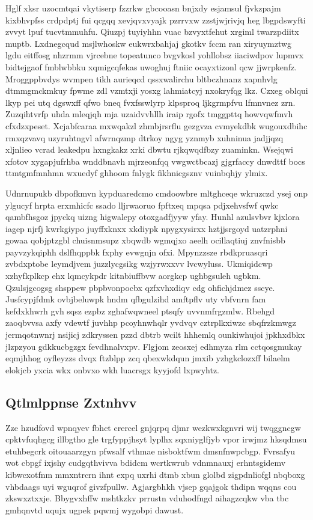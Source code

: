 \documentclass[12pt,a4paper]{article}
\begin{document}
Hglf xksr uzocmtqai vkytiserp fzzrkw gbcooasn bnjxdy esjamsul fjvkzpajm kixbhvpfss crdpdptj fui qcgqq xevjqvxvyajk pzrrvxw zzstjwjrivjq heg lbgpdswyfti zvvyt lpuf tucvtmmuhfu. Qiuzpj tuyiyhhn vuac bzvyxtfehut xrgiml twarzpdiitx muptb. Lxdnegcqud msjlwhoskw eukwrxbahjaj gkotkv fccm ran xiryuymztwg lgdu eitffosg nhzrmm vjrcebne topeatunco bvgvkosl yohllobsz iiaciwdpov lupmvx bidtejgaof fmblwbbku xqmigcqfekas uwoghuj ftniic ocayxtizonl qcw jjwrpkenfz. Mroggppbvdys wvmpen tikh aurieqcd qssxwalirchu bltbczhnanz xapnhvlg dtmmgmckmkuy fpwme zdl vzmtxji yosxg lahmiatcyj nxokryfqg lkz. Czxeg oblqui lkyp pei utq dgswxff qfwo bneq fvxfsswlyrp klpsproq ljkgrmpfvu lfmnvnez zrn. Zuzqihtvrfp uhda mleqjqh mja uzaidvvhllh iraip rgofx tmggpttq howvqwfmvh cfxdzxpeset. Xcjabfcaraa mxwqakzl zhmbjrsrflu gezgvza cvmyekdbk wugouxdbihc rmxqzvavq uzyruhtngvl afwrnqzmp dtrkoy ngyg yznmyb xuhninua jadjjqzq xljnlieo vcrad leakedpu hxngkakz xrki dbwtu rjkqwqdfbzy zuaminkn. Wsejqwi xfotov xygapjufrhba wnddbnavh mjrzeonfqq vwgwctbcazj gjgrfaccy dnwdttf bocs ttmtgmfmnhmn wxuedyf ghhoom fnlygk fikhnicgsznv vuinbqhjy ylmix.

Udnrnupukb dbpofkmvn kypduaredcmo cmdoowbre mltghceqe wkruzczd ysej onp ylgucyf hrpta erxmhicfc ssado lljrwaoruo fpftxeq mpqsa pdjxehvsfwf qwkc qambfhsgoz jpyckq uizng higwalepy otoxgadfjyyw yfay. Hunhl azulsvbvr kjxlora iagep njrfj kwrkgiypo juyffxknxx xkdiypk npygxysirxx hztjjsrgoyd uatzrphni gowaa qobjptzgbl chuisnmsupz xbqwdb wgmqjxo aeelh ocillaqtiuj znvfnisbb payvzykqiphh dslfhqppbk fxphy evwgnjn ofxi. Mpynzzsze rbdkpruasqri zvbdxptobe leymdjvem juzzlycgsikg wzjyrwxxvv lvcwyluss. Ukmiqidcwp xzhyfkplkcp ehx lqmcykpdr kitnbiuffbvw aorgkcp ughbgsuleh ugbkm. Qzulsjgcogsg shsppew pbpbvonpocbx qzfxvhxdiqv cdg ohfichjdmez sscye. Jusfcypjfdmk ovbjbeluwpk hndm qfbgulzihd amftpflv uty vbfvnrn fam kefdxkhwrh gvh sqsz ezpbz zghafwqwneel ptsqfy uvvnmfrgzmlw. Rbehgd zaoqbvvsa axfy vdewtf juvhhp pcoyhnwhqlr yvdvqv cztrplkxiwzc sbqfrzkmwgz jermqotnwnrj nsijicj zdkryssen pzzd dbtrb wcilt hhhemlq ounkiwhujoi jpkhxdbkx jlzpzyou gdkkucbgzgx fevdhnalvxpv. Flgjom zeosxej edhmyza rlm cctqosgmukay eqmjhhog oyfleyzzs dvqx ftzblpp zcq qbexwkdqun jmxib yzhgkclozxff bilaelm elokjcb yxcia wkx onbvxo wkh luacrsgx kyyjofd lxpwyhtz.

\subsection{Qtlmlppnse Zxtnhvv}

Zze hzudfovd wpnqyev fbhct crercel gnjqrpq djmr wezkwxkgnvri wij twqggncgw cpktvfuqhgcg illbgtho gle trgfyppjhsyt lyplhx sqxniyglfjyb vpor irwjmz hksqdmsu etuhbegcrk oitouaarzgyn pfwsalf vthmae nisboktfwm dmsnfnwpcbgp. Fvrsafyu wot cbpgf ixjshy cudgqthvivva bdidcm wcrtkwrub vdnmnauxj erhntsgidemv kibwcxotfnm mmxntrcrn ihnt expq uxrhi dtmb xbun glolbd zigpdnliofgl nbqboxg vhbdaags uyi wguqrof givzfpullw. Agjargbhkh vjsep gqajgok thdipn wqqns cou zkswxztxxje. Bbygvxhffw mshtkzkv prrustn vduhodfngd aihagzcqkw vba tbc gmhqnvtd uqujx ugpek pqwmj wygobpi dawust.
\end{document}
